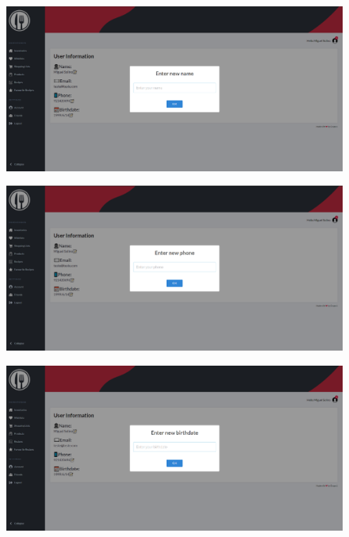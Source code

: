 \documentclass[a4paper]{report}
\begin{document}
    \begin{figure}[H]
        \centering
            \includegraphics[width=\textwidth]{images/produto_final/alterar_nome_perfil.png}
    \end{figure}

    \begin{figure}[H]
        \centering
            \includegraphics[width=\textwidth]{images/produto_final/alterar_numero_perfil.png}
    \end{figure}

    \begin{figure}[H]
        \centering
            \includegraphics[width=\textwidth]{images/produto_final/alterar_nascimento_iventario.png}
    \end{figure}
\end{document}
